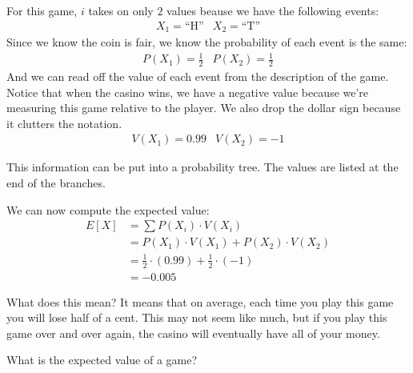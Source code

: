 \documentclass{ximera}
\begin{document}
For this game, $i$ takes on only $2$ values beause we have the following events:
\[ \begin{array}{cc}
      X_1 = \text{``H''} & X_2 = \text{``T''} 
\end{array} \]
Since we know the coin is fair, we know the probability of each event is the same:
\[ \begin{array}{cc}
      P(X_1) = \frac{1}{2} & P(X_2) = \frac{1}{2}
\end{array} \]
And we can read off the value of each event from the description of the game. Notice that when the casino wins, we have a negative value because we're measuring this game relative to the player. We also drop the dollar sign because it clutters the notation.
\[ \begin{array}{cc}
      V(X_1) = 0.99 & V(X_2) = -1
\end{array} \]

This information can be put into a probability tree. The values are listed at the end of the branches.

\begin{image}
\end{image}

We can now compute the expected value:
\begin{align*}
  E[X] & = \sum P(X_i) \cdot V(X_i) \\
    & = P(X_1) \cdot V(X_1) + P(X_2) \cdot V(X_2) \\
    & = \frac{1}{2} \cdot (0.99) + \frac{1}{2} \cdot (-1) \\
    & = -0.005
\end{align*}

What does this mean? It means that on average, each time you play this game you will lose half of a cent. This may not seem like much, but if you play this game over and over again, the casino will eventually have all of your money.

\begin{question}
What is the expected value of a game?

    \begin{multipleChoice}
    \end{multipleChoice}

\end{question}
\end{document}
